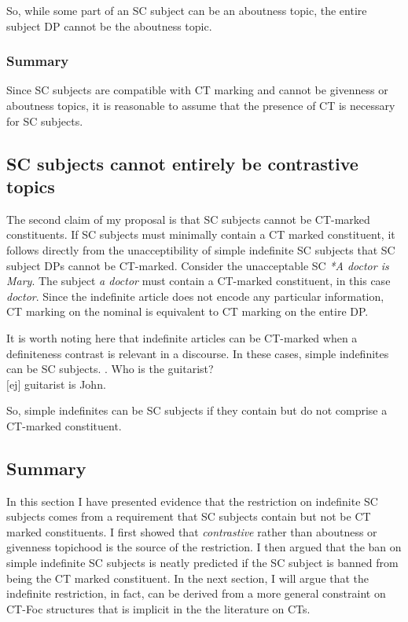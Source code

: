 \documentclass[GPFinal]{subfiles}
\begin{document}
So, while some part of an SC subject can be an aboutness topic, the entire subject DP cannot be the aboutness topic.
\subsubsection{Summary}
Since SC subjects are compatible with CT marking and cannot be givenness or aboutness topics, it is reasonable to assume that the presence of CT is necessary for SC subjects.
\subsection{SC subjects cannot entirely be contrastive topics}
The second claim of my proposal is that SC subjects cannot be CT-marked constituents.
If SC subjects must minimally contain a CT marked constituent, it follows directly from the unacceptibility of simple indefinite SC subjects that SC subject DPs cannot be CT-marked.
Consider the unacceptable SC \textit{*A doctor is Mary}.
The subject \textit{a doctor} must contain a CT-marked constituent, in this case \textit{doctor}.
Since the indefinite article does not encode any particular information, CT marking on the nominal is equivalent to CT marking on the entire DP.

It is worth noting here that indefinite articles can be CT-marked when a definiteness contrast is relevant in a discourse.
In these cases, simple indefinites can be SC subjects.
\ex. Who is the guitarist?\\
$[$ej$]$ guitarist is John.

So, simple indefinites can be SC subjects if they contain but do not comprise a CT-marked constituent.
\subsection{Summary}
In this section I have presented evidence that the restriction on indefinite SC subjects comes from a requirement that SC subjects contain but not be CT marked constituents.
I first showed that \textit{contrastive} rather than aboutness or givenness topichood is the source of the restriction.
I then argued that the ban on simple indefinite SC subjects is neatly predicted if the SC subject is banned from being the CT marked constituent.
In the next section, I will argue that the indefinite restriction, in fact, can be derived from a more general constraint on CT-Foc structures that is implicit in the the literature on CTs.
\end{document}
